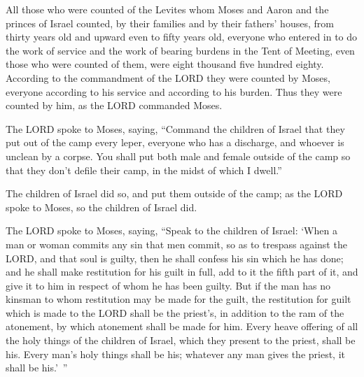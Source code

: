 \myverse{}All those who were counted of the Levites whom Moses and Aaron
and the princes of Israel counted, by their families and by their fathers’ houses,
\myverse{}from thirty years old and upward even to fifty years old, everyone who entered
in to do the work of service and the work of bearing burdens in the Tent of Meeting,
\myverse{}even those who were counted of them, were eight thousand five hundred eighty.
\myverse{}According to the commandment of the LORD they were counted by Moses, everyone
according to his service and according to his burden. Thus they were counted by him, as the LORD commanded
Moses.


\mychapter{} \myverse*{}The LORD spoke to Moses, saying,
\myverse{}“Command the children of Israel that they put out of the camp every leper, everyone
who has a discharge, and whoever is unclean by a corpse.
\myverse{}You shall put both male and female outside of the camp so that they don’t defile
their camp, in the midst of which I dwell.”


\myverse{}The children of Israel did so, and put them outside of the camp;
as the LORD spoke to Moses, so the children of Israel did.


\myverse{}The LORD spoke to Moses, saying,
\myverse{}“Speak to the children of Israel: ‘When a man or woman commits any sin that
men commit, so as to trespass against the LORD, and that soul is guilty,
\myverse{}then he shall confess his sin which he has done; and he shall make restitution
for his guilt in full, add to it the fifth part of it, and give it to him in respect of whom he has been
guilty.
\myverse{}But if the man has no kinsman to whom restitution may be made for the guilt,
the restitution for guilt which is made to the LORD shall be the priest’s, in addition to the ram of the
atonement, by which atonement shall be made for him.
\myverse{}Every heave offering of all the holy things of the children of Israel, which
they present to the priest, shall be his.
\myverse{}Every man’s holy things shall be his; whatever any man gives the priest, it
shall be his.’ ”


